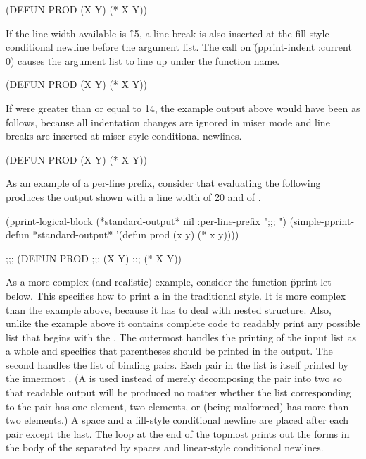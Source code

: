\code
 (DEFUN PROD (X Y) 
   (* X Y))
\endcode 

If the line width available is \f{15}, a line break is also inserted at the
fill style conditional newline before the argument list.  The call on
\f{(pprint-indent :current 0)} causes the argument list to line up under the
function name.
 
\code
(DEFUN PROD
       (X Y)
  (* X Y))
\endcode
 
If  were greater than or equal to 14, the example 
output above would have been as follows, because all indentation changes 
are ignored in miser mode and line breaks are inserted at miser-style
conditional newlines.
 
\code
 (DEFUN
  PROD
  (X Y)
  (* X Y))
\endcode 

As an example of a per-line prefix, consider that evaluating the following
produces the output shown with a line width of \f{20} and
 of \nil.
 
\code
 (pprint-logical-block (*standard-output* nil :per-line-prefix ";;; ")
   (simple-pprint-defun *standard-output* '(defun prod (x y) (* x y))))
 
 ;;; (DEFUN PROD
 ;;;        (X Y)
 ;;;   (* X Y))
\endcode
 
As a more complex (and realistic) example, consider the function \f{pprint-let}
below.  This specifies how to print a   in the traditional
style.  It is more complex than the example above, because it has to deal with
nested structure.  Also, unlike the example above it contains complete code to 
readably print any possible list that begins with the  .
The outermost   handles the printing of
the input list as a whole and specifies that parentheses should be printed in the
output.  The second   handles the list 
of binding pairs.  Each pair in the list is itself printed by the innermost
.  (A   is used instead of
merely decomposing the pair into two  so that readable output will
be produced no matter whether the list corresponding to the pair has one element,
two elements, or (being malformed) has more than two elements.)   
A space and a fill-style conditional newline are placed after
each pair except the last.  The loop at the end of the topmost
  prints out the forms in the body
of the   separated by spaces and 
linear-style conditional newlines.
 
